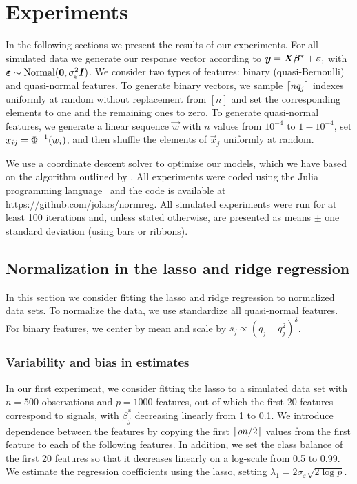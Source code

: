\section{Experiments}

In the following sections we present the results of our experiments. For all simulated data
we generate our response vector according to \(\boldsymbol{y} = \boldsymbol{X}\boldsymbol{\beta}^* +
\boldsymbol{\varepsilon},\) with \(\boldsymbol{\varepsilon} \sim \operatorname{Normal}(\boldsymbol{0}, \sigma_\varepsilon^2
\boldsymbol{I})\). We consider two types of features: binary (quasi-Bernoulli) and quasi-normal
features. To generate binary vectors, we sample \(\lceil nq_j \rceil\) indexes uniformly at random
without replacement from \([n]\) and set the corresponding elements to one and the
remaining ones to zero. To generate quasi-normal features, we generate a linear sequence
\(\vec{w}\) with \(n\) values from \(10^{-4}\) to \(1 - 10^{-4}\), set \(x_{ij} =
\operatorname{\Phi}^{-1}(w_i)\), and then shuffle the elements of \(\vec{x}_j\) uniformly at random.

We use a coordinate descent solver to optimize our models, which we have based on the
algorithm outlined by \citet{friedman2010}. All experiments were coded using the Julia
programming language~\citep{bezanson2017} and the code is available at
\url{https://github.com/jolars/normreg}.
All simulated experiments were run for at least 100 iterations and, unless stated
otherwise, are presented as means $\pm$ one standard deviation (using bars or ribbons).

\subsection{Normalization in the lasso and ridge regression}%
\label{sec:experiments-lassoridge}

In this section we consider fitting the lasso and ridge regression to normalized data sets.
To normalize the data, we use standardize all quasi-normal features. For binary features,
we center by mean and scale by \(s_j \propto (q_j-q_j^2)^\delta\).

\subsubsection{Variability and bias in estimates}

In our first experiment, we consider fitting the lasso to a simulated data set with
\(n=500\) observations and \(p = \num{1000}\) features, out of which the first 20 features
correspond to signals, with \(\beta_j^*\) decreasing linearly from 1 to 0.1. We introduce
dependence between the features by copying the first \(\lceil \rho n/2 \rceil\) values from the
first feature to each of the following features. In addition, we set the class balance of
the first 20 features so that it decreases linearly on a log-scale from 0.5 to 0.99. We
estimate the regression coefficients using the lasso, setting \(\lambda_1 = 2
\sigma_\varepsilon \sqrt{2 \log p }\).

